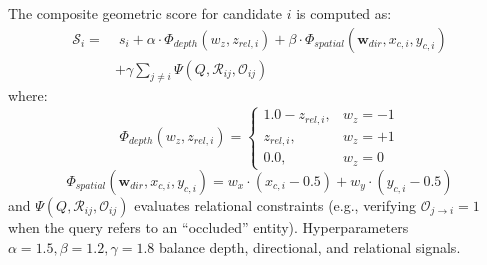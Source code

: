 \documentclass[10pt,twocolumn,letterpaper]{article}
\begin{document}
The composite geometric score for candidate $i$ is computed as:
\begin{align}
\mathcal{S}_i = & \; s_i + \alpha \cdot \Phi_{depth}(w_z, z_{rel,i}) + \beta \cdot \Phi_{spatial}(\mathbf{w}_{dir}, x_{c,i}, y_{c,i}) \nonumber \\
& + \gamma \sum_{j \neq i} \Psi(Q, \mathcal{R}_{ij}, \mathcal{O}_{ij})
\label{eq:score}
\end{align}
where:
\begin{equation}
\Phi_{depth}(w_z, z_{rel,i}) = \begin{cases} 
1.0 - z_{rel,i}, & w_z = -1 \\ 
z_{rel,i}, & w_z = +1 \\ 
0.0, & w_z = 0 
\end{cases}
\end{equation}
\begin{equation}
\Phi_{spatial}(\mathbf{w}_{dir}, x_{c,i}, y_{c,i}) = w_x \cdot (x_{c,i} - 0.5) + w_y \cdot (y_{c,i} - 0.5)
\end{equation}
and $\Psi(Q, \mathcal{R}_{ij}, \mathcal{O}_{ij})$ evaluates relational constraints (e.g., verifying $\mathcal{O}_{j \to i} = 1$ when the query refers to an ``occluded'' entity). Hyperparameters $\alpha = 1.5, \beta = 1.2, \gamma = 1.8$ balance depth, directional, and relational signals.
\end{document}
